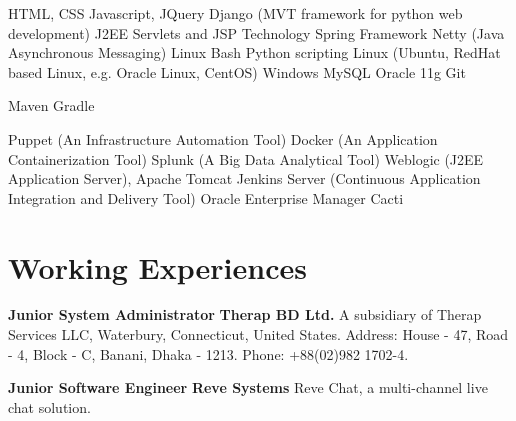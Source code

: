 \documentclass[11pt,a4paper,sans]{moderncv}
\begin{document}
{
HTML, CSS
\newline Javascript, JQuery
\newline Django (MVT framework for python web development)
\newline J2EE Servlets and JSP Technology
\newline Spring Framework
\newline Netty (Java Asynchronous Messaging)
}
{
Linux Bash
\newline Python scripting
}
{
Linux (Ubuntu, RedHat based Linux, e.g. Oracle Linux, CentOS)
\newline Windows
}
{
MySQL
\newline Oracle 11g
}
{
Git
}

{
Maven
\newline Gradle
}

{
Puppet (An Infrastructure Automation Tool)
\newline Docker (An Application Containerization Tool)
\newline Splunk (A Big Data Analytical Tool)
\newline Weblogic (J2EE Application Server), Apache Tomcat
\newline Jenkins Server (Continuous Application Integration and Delivery Tool)
\newline Oracle Enterprise Manager
\newline Cacti
}


\section{Working Experiences}
{
\textbf{Junior System Administrator\newline}
\textbf{Therap BD Ltd.\newline}
A subsidiary of Therap Services LLC, Waterbury, Connecticut, United States.\newline
Address: House - 47, Road - 4, Block - C, Banani, Dhaka - 1213. \newline
Phone: +88(02)982 1702-4.
}

{
\textbf{Junior Software Engineer\newline}
\textbf{Reve Systems\newline}
Reve Chat, a multi-channel live chat solution.
}
\end{document}
